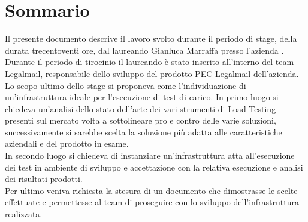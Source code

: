 
\cleardoublepage
{}
{}
\begingroup
\let\clearpage\relax
\let\cleardoublepage\relax
\let\cleardoublepage\relax

\chapter*{Sommario}

Il presente documento descrive il lavoro svolto durante il periodo di stage, della durata trecentoventi ore, dal laureando Gianluca Marraffa presso l'azienda \myCompany. \\
Durante il periodo di tirocinio il laureando è stato inserito all'interno del team Legalmail, responsabile dello sviluppo del prodotto PEC Legalmail dell'azienda.\\
Lo scopo ultimo dello stage si proponeva come l'individuazione di un'infrastruttura ideale per l'esecuzione di test di carico. In primo luogo si chiedeva un'analisi dello stato dell'arte dei vari strumenti di Load Testing presenti sul mercato volta a sottolineare pro e contro delle varie soluzioni, successivamente si sarebbe scelta la soluzione più adatta alle caratteristiche aziendali e del prodotto in esame. \\
In secondo luogo si chiedeva di instanziare un'infrastruttura atta all'esecuzione dei test in ambiente di sviluppo e accettazione con la relativa esecuzione e analisi dei risultati prodotti. \\
Per ultimo veniva richiesta la stesura di un documento che dimostrasse le scelte effettuate e permettesse al team di proseguire con lo sviluppo dell'infrastruttura realizzata.

%
%

\endgroup			

\vfill

